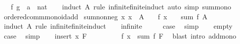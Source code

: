 \begin{isabellebody}
\ \ \ f\ g\ {\isacharcolon}{\kern0pt}{\isacharcolon}{\kern0pt}\ {\isachardoublequoteopen}{\isacharprime}{\kern0pt}a\ {\isasymRightarrow}\ nat{\isachardoublequoteclose}\isanewline
%
\isadelimproof
\ \ %
\endisadelimproof
%
\isatagproof
{}\isamarkupfalse%
\ {\isacharparenleft}{\kern0pt}induct\ A\ rule{\isacharcolon}{\kern0pt}\ infinite{\isacharunderscore}{\kern0pt}finite{\isacharunderscore}{\kern0pt}induct{\isacharparenright}{\kern0pt}\ {\isacharparenleft}{\kern0pt}auto\ simp{\isacharcolon}{\kern0pt}\ sum{\isacharunderscore}{\kern0pt}mono{\isacharparenright}{\kern0pt}%
\endisatagproof
{\isafoldproof}%
%
\isadelimproof
\isanewline
%
\endisadelimproof
\isanewline
{}\isamarkupfalse%
\ ordered{\isacharunderscore}{\kern0pt}comm{\isacharunderscore}{\kern0pt}monoid{\isacharunderscore}{\kern0pt}add\isanewline
{}\isanewline
\isanewline
{}\isamarkupfalse%
\ sum{\isacharunderscore}{\kern0pt}nonneg{\isacharcolon}{\kern0pt}\ {\isachardoublequoteopen}{\isacharparenleft}{\kern0pt}{\isasymAnd}x{\isachardot}{\kern0pt}\ x\ {\isasymin}\ A\ {\isasymLongrightarrow}\ {}\ {\isasymle}\ f\ x{\isacharparenright}{\kern0pt}\ {\isasymLongrightarrow}\ {}\ {\isasymle}\ sum\ f\ A{\isachardoublequoteclose}\isanewline
%
\isadelimproof
%
\endisadelimproof
%
\isatagproof
{}\isamarkupfalse%
\ {\isacharparenleft}{\kern0pt}induct\ A\ rule{\isacharcolon}{\kern0pt}\ infinite{\isacharunderscore}{\kern0pt}finite{\isacharunderscore}{\kern0pt}induct{\isacharparenright}{\kern0pt}\isanewline
\ \ \isamarkupfalse%
\ infinite\isanewline
\ \ \isamarkupfalse%
\ \isamarkupfalse%
\ {\isacharquery}{\kern0pt}case\ \isamarkupfalse%
\ simp\isanewline
{}\isamarkupfalse%
\isanewline
\ \ \isamarkupfalse%
\ empty\isanewline
\ \ \isamarkupfalse%
\ \isamarkupfalse%
\ {\isacharquery}{\kern0pt}case\ \isamarkupfalse%
\ simp\isanewline
{}\isamarkupfalse%
\isanewline
\ \ \isamarkupfalse%
\ {\isacharparenleft}{\kern0pt}insert\ x\ F{\isacharparenright}{\kern0pt}\isanewline
\ \ \isamarkupfalse%
\ \isamarkupfalse%
\ {\isachardoublequoteopen}{}\ {\isacharplus}{\kern0pt}\ {}\ {\isasymle}\ f\ x\ {\isacharplus}{\kern0pt}\ sum\ f\ F{\isachardoublequoteclose}\ \isamarkupfalse%
\ {\isacharparenleft}{\kern0pt}blast\ intro{\isacharcolon}{\kern0pt}\ add{\isacharunderscore}{\kern0pt}mono{\isacharparenright}{\kern0pt}\isanewline

\end{isabellebody}
